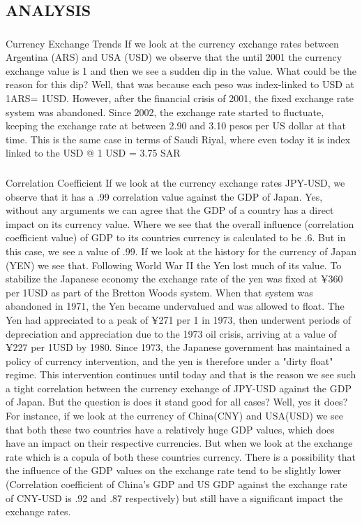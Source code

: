 \subsection{ANALYSIS}
\subsubsection{}{Currency Exchange Trends}
If we look at the currency exchange rates between Argentina (ARS) and USA (USD) we observe that the until 2001 the currency exchange value is 1 and then we see a sudden dip in the value. What could be the reason for this dip? Well, that was because each peso was index-linked to USD at 1ARS= 1USD. However, after the financial crisis of 2001, the fixed exchange rate system was abandoned. Since 2002, the exchange rate started to fluctuate, keeping the exchange rate at between 2.90 and 3.10 pesos per US dollar at that time.  
This is the same case in terms of Saudi Riyal, where even today it is index linked to the USD @ 1 USD = 3.75 SAR 
\subsubsection{}{Correlation Coefficient}
If we look at the currency exchange rates JPY-USD, we observe that it has a .99 correlation value against the GDP of Japan. Yes, without any arguments we can agree that the GDP of a country has a direct impact on its currency value. Where we see that the overall influence (correlation coefficient value) of GDP to its countries currency is calculated to be .6. But in this case, we see a value of .99.
\newline
If we look at the history for the currency of Japan (YEN) we see that. Following World War II the Yen lost much of its value. To stabilize the Japanese economy the exchange rate of the yen was fixed at ¥360 per 1USD as part of the Bretton Woods system. When that system was abandoned in 1971, the Yen became undervalued and was allowed to float. The Yen had appreciated to a peak of ¥271 per 1 in 1973, then underwent periods of depreciation and appreciation due to the 1973 oil crisis, arriving at a value of ¥227 per 1USD by 1980. Since 1973, the Japanese government has maintained a policy of currency intervention, and the yen is therefore under a "dirty float" regime. This intervention continues until today and that is the reason we see such a tight correlation between the currency exchange of JPY-USD against the GDP of Japan.\newline
But the question is does it stand good for all cases? Well, yes it does? For instance, if we look at the currency of China(CNY) and USA(USD) we see that both these two countries have a relatively huge GDP values, which does have an impact on their respective currencies. But when we look at the exchange rate which is a copula of both these countries currency. There is a possibility that the influence of the GDP values on the exchange rate tend to be slightly lower (Correlation coefficient of China’s GDP and US GDP against the exchange rate of CNY-USD is .92 and .87 respectively) but still have a significant impact the exchange rates. 

